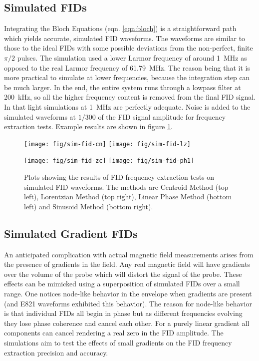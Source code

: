 \subsection{Simulated FIDs}
Integrating the Bloch Equations (eqn. \ref{eqn:bloch}) is a straightforward path which yields accurate, simulated FID waveforms.  The waveforms are similar to those to the ideal FIDs with some possible deviations from the non-perfect, finite $\pi/2$ pulses.  The simulation used a lower Larmor frequency of around \SI{1}{\MHz} as opposed to the real Larmor frequency of \SI{61.79}{\MHz}.  The reason being that it is more practical to simulate at lower frequencies, because the integration step can be much larger.  In the end, the entire system runs through a lowpass filter at \SI{200}{\kHz}, so all the higher frequency content is removed from the final FID signal.  In that light simulations at \SI{1}{\MHz} are perfectly adequate.  Noise is added to the simulated waveforms at $1/300$ of the FID signal amplitude for frequency extraction tests.  Example results are shown in figure \ref{fig:fid-sim-freq-extraction}.

\begin{figure}
\centering
\texttt{[image: fig/sim-fid-cn]}
\texttt{[image: fig/sim-fid-lz]}

\texttt{[image: fig/sim-fid-zc]}
\texttt{[image: fig/sim-fid-ph1]}

\caption{
    Plots showing the results of FID frequency extraction tests on simulated FID waveforms.  The methods are Centroid Method (top left), Lorentzian Method (top right), Linear Phase Method (bottom left) and Sinusoid Method (bottom right).  
    \label{fig:fid-sim-freq-extraction}
}
\end{figure}

\subsection{Simulated Gradient FIDs}
An anticipated complication with actual magnetic field measurements arises from the presence of gradients in the field.  Any real magnetic field will have gradients over the volume of the probe which will distort the signal of the probe.  These effects can be mimicked using a superposition of simulated FIDs over a small range.  One notices node-like behavior in the envelope when gradients are present (and E821 waveforms exhibited this behavior).  The reason for node-like behavior is that individual FIDs all begin in phase but as different frequencies evolving they lose phase coherence and cancel each other.  For a purely linear gradient all components can cancel rendering a real zero in the FID amplitude.  The simulations aim to test the effects of small gradients on the FID frequency extraction precision and accuracy.

